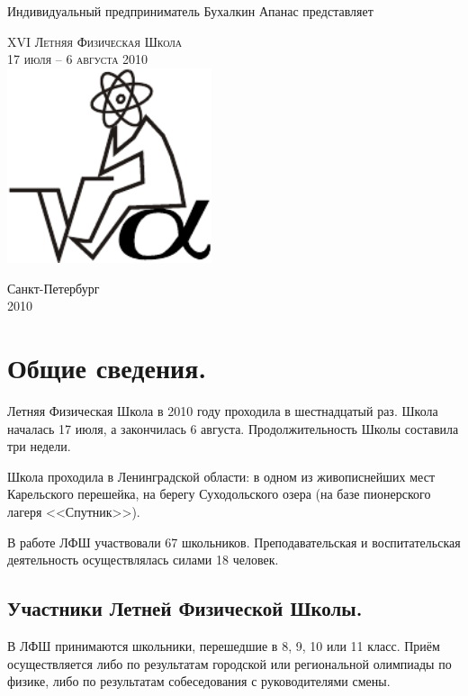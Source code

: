 \documentclass[12pt,a4paper,oneside]{scrartcl}
\newlength{\h}
\newlength{\x}
\begin{document}
\parindent=5mm
\begin{center}
  \small{\textsf{Индивидуальный предприниматель Бухалкин Апанас представляет}}

\vfill
\LARGE{\textsc{XVI Летняя Физическая Школа}}\\
\Large{\textsc{17 июля -- 6 августа 2010}}\\[2cm]
\includegraphics[width=6cm]{logo.pdf}
\vfill

\small{\textsf{Санкт-Петербург}\\
\textsf{2010}}
\end{center}

\clearpage

\tableofcontents

\clearpage

\section{Общие сведения.}
\label{sec:general}

Летняя Физическая Школа в 2010 году проходила в шестнадцатый
раз. Школа началась 17 июля, а закончилась 6
августа. Продолжительность Школы составила три недели.

Школа проходила в Ленинградской области: в одном из живописнейших мест
Карельского перешейка, на берегу Суходольского озера (на базе
пионерского лагеря <<Спутник>>).

В работе ЛФШ участвовали 67 школьников. Преподавательская и воспитательская
деятельность осуществлялась силами 18 человек.

\subsection{Участники Летней Физической Школы. }
\label{sec:scholars}

В ЛФШ принимаются школьники, перешедшие в 8, 9, 10 или 11 класс. Приём
осуществляется либо по результатам городской или региональной
олимпиады по физике, либо по результатам собеседования с
руководителями смены.
\smallskip
\end{document}
